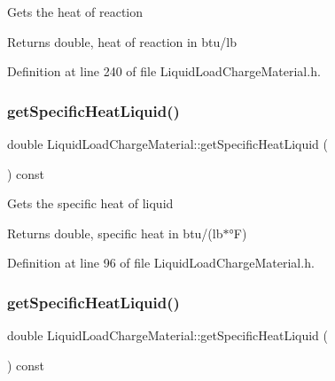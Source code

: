 Gets the heat of reaction \begin{DoxyReturn}{Returns}
double, heat of reaction in btu/lb 
\end{DoxyReturn}


Definition at line 240 of file Liquid\+Load\+Charge\+Material.\+h.

\mbox{\label{class_liquid_load_charge_material_aa698f1f73dff91951139a4a50582963d}} 
\subsubsection{\texorpdfstring{get\+Specific\+Heat\+Liquid()}{getSpecificHeatLiquid()}\hspace{0.1cm}{\footnotesize\ttfamily [1/3]}}
{\footnotesize\ttfamily double Liquid\+Load\+Charge\+Material\+::get\+Specific\+Heat\+Liquid (\begin{DoxyParamCaption}{ }\end{DoxyParamCaption}) const\hspace{0.3cm}{\ttfamily [inline]}}

Gets the specific heat of liquid \begin{DoxyReturn}{Returns}
double, specific heat in btu/(lb$\ast$°F) 
\end{DoxyReturn}


Definition at line 96 of file Liquid\+Load\+Charge\+Material.\+h.

\mbox{\label{class_liquid_load_charge_material_aa698f1f73dff91951139a4a50582963d}} 
\subsubsection{\texorpdfstring{get\+Specific\+Heat\+Liquid()}{getSpecificHeatLiquid()}\hspace{0.1cm}{\footnotesize\ttfamily [2/3]}}
{\footnotesize\ttfamily double Liquid\+Load\+Charge\+Material\+::get\+Specific\+Heat\+Liquid (\begin{DoxyParamCaption}{ }\end{DoxyParamCaption}) const\hspace{0.3cm}{\ttfamily [inline]}}

